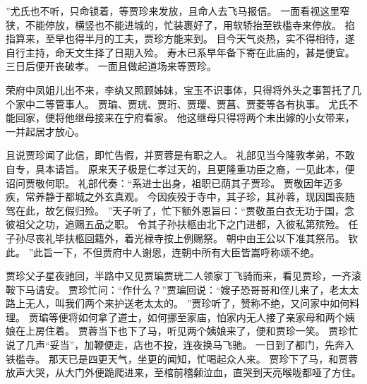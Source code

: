”尤氏也不听，只命锁着，等贾珍来发放，且命人去飞马报信。
一面看视这里窄狭，不能停放，横竖也不能进城的，忙装裹好了，用软轿抬至铁槛寺来停放。
掐指算来，至早也得半月的工夫，贾珍方能来到。
目今天气炎热，实不得相待，遂自行主持，命天文生择了日期入殓。
寿木已系早年备下寄在此庙的，甚是便宜。
三日后便开丧破孝。
一面且做起道场来等贾珍。
\par
荣府中凤姐儿出不来，李纨又照顾姊妹，宝玉不识事体，只得将外头之事暂托了几个家中二等管事人。
贾㻞、贾珖、贾珩、贾璎、贾菖、贾菱等各有执事。
尤氏不能回家，便将他继母接来在宁府看家。
他这继母只得将两个未出嫁的小女带来，一并起居才放心。
\par
且说贾珍闻了此信，即忙告假，并贾蓉是有职之人。
礼部见当今隆敦孝弟，不敢自专，具本请旨。
原来天子极是仁孝过天的，且更隆重功臣之裔，一见此本，便诏问贾敬何职。
礼部代奏：“系进士出身，祖职已荫其子贾珍。
贾敬因年迈多疾，常养静于都城之外玄真观。
今因疾殁于寺中，其子珍，其孙蓉，现因国丧随驾在此，故乞假归殓。
”天子听了，忙下额外恩旨曰：“贾敬虽白衣无功于国，念彼祖父之功，追赐五品之职。
令其子孙扶柩由北下之门进都，入彼私第殡殓。
任子孙尽丧礼毕扶柩回籍外，着光禄寺按上例赐祭。
朝中由王公以下准其祭吊。
钦此。
”此旨一下，不但贾府中人谢恩，连朝中所有大臣皆嵩呼称颂不绝。
\par
贾珍父子星夜驰回，半路中又见贾㻞贾珖二人领家丁飞骑而来，看见贾珍，一齐滚鞍下马请安。
贾珍忙问：“作什么？”贾㻞回说：“嫂子恐哥哥和侄儿来了，老太太路上无人，叫我们两个来护送老太太的。
”贾珍听了，赞称不绝，又问家中如何料理。
贾㻞等便将如何拿了道士，如何挪至家庙，怕家内无人接了亲家母和两个姨娘在上房住着。
贾蓉当下也下了马，听见两个姨娘来了，便和贾珍一笑。
贾珍忙说了几声“妥当”，加鞭便走，店也不投，连夜换马飞驰。
一日到了都门，先奔入铁槛寺。
那天已是四更天气，坐更的闻知，忙喝起众人来。
贾珍下了马，和贾蓉放声大哭，从大门外便跪爬进来，至棺前稽颡泣血，直哭到天亮喉咙都哑了方住。
